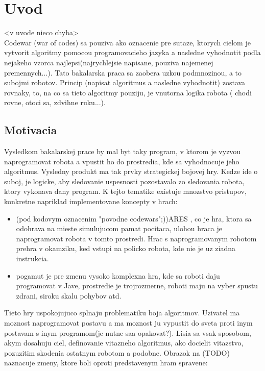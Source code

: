 \documentclass[12pt,notitlepage]{report}
\begin{document}
\chapter{Uvod}
<v uvode nieco chyba>\\
Codewar (war of codes) sa pouziva ako oznacenie pre sutaze, ktorych cielom je vytvorit algoritmy pomocou programovacieho jazyka a nasledne vyhodnotit podla nejakeho vzorca najlepsi(najrychlejsie napisane, pouziva najemenej premennych...). Tato bakalarska praca sa zaobera uzkou podmnozinou, a to subojmi robotov. Princip (napisat algoritmus a nasledne vyhodnotit) zostava rovnaky, to, na co sa tieto algoritmy pouziju, je vnutorna logika robota ( chodi rovne, otoci sa, zdvihne ruku...).
\section{Motivacia}
Vysledkom bakalarskej prace by mal byt taky program, v ktorom je vyzvou naprogramovat robota a vpustit ho do prostredia, kde sa vyhodnocuje jeho algoritmus. Vysledny produkt ma tak prvky strategickej bojovej hry. Kedze ide o suboj, je logicke, aby sledovanie uspesnosti pozostavalo zo sledovania robota, ktory vykonava dany program. K tejto tematike existuje mnozstvo pristupov, konkretne napriklad implementovane koncepty v hrach:
\begin{itemize}
\item (pod kodovym oznacenim "povodne codewars";))ARES , co je hra, ktora sa odohrava na mieste simulujucom pamat pocitaca, ulohou hraca je naprogramovat robota v tomto prostredi. Hrac s naprogramovanym robotom prehra v okamziku, ked vstupi na policko robota, kde nie je uz ziadna instrukcia.
\item pogamut je pre zmenu vysoko komplexna hra, kde sa roboti daju programovat v Jave, prostredie je trojrozmerne, roboti maju na vyber spustu zdrani, siroku skalu pohybov atd.
\end{itemize}
Tieto hry uspokojujuco splnaju problematiku boja algoritmov. Uzivatel ma moznost naprogramovat postavu a  ma moznost ju vypustit do sveta proti inym postavam s inym programom(je nutne saa opakovat?). Lisia sa vsak sposobom, akym dosahuju ciel, definovanie vitazneho algoritmus, ako docielit vitazstvo, pozuzitim skodenia ostatnym robotom a podobne. Obrazok na (TODO) naznacuje zmeny, ktore boli oproti predstavenym hram spravene:
\end{document}
